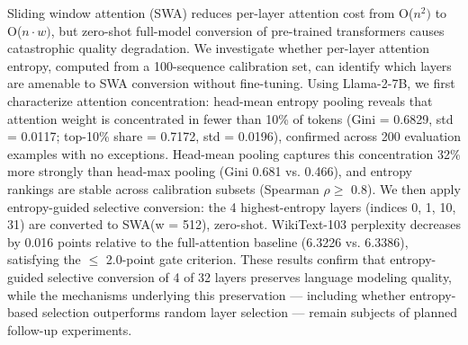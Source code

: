 
Sliding window attention (SWA) reduces per-layer attention cost from O($n^{2})$ to O($n\cdot w)$, but zero-shot full-model conversion of pre-trained transformers causes catastrophic quality degradation. We investigate whether per-layer attention entropy, computed from a 100-sequence calibration set, can identify which layers are amenable to SWA conversion without fine-tuning. Using Llama-2-7B, we first characterize attention concentration: head-mean entropy pooling reveals that attention weight is concentrated in fewer than 10\% of tokens (Gini = 0.6829, std = 0.0117; top-10\% share = 0.7172, std = 0.0196), confirmed across 200 evaluation examples with no exceptions. Head-mean pooling captures this concentration 32\% more strongly than head-max pooling (Gini 0.681 vs. 0.466), and entropy rankings are stable across calibration subsets (Spearman $\rho \geq$ 0.8). We then apply entropy-guided selective conversion: the 4 highest-entropy layers (indices 0, 1, 10, 31) are converted to SWA(w = 512), zero-shot. WikiText-103 perplexity decreases by 0.016 points relative to the full-attention baseline (6.3226 vs. 6.3386), satisfying the $\leq$ 2.0-point gate criterion. These results confirm that entropy-guided selective conversion of 4 of 32 layers preserves language modeling quality, while the mechanisms underlying this preservation --- including whether entropy-based selection outperforms random layer selection --- remain subjects of planned follow-up experiments.

